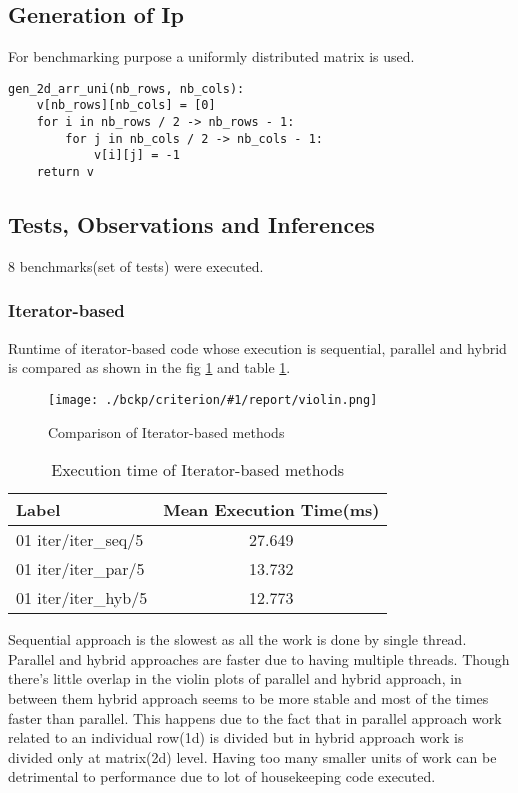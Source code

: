 \documentclass{article}
\newcommand{\loadGraph}[3]{{%
\begin{figure}[!ht]
    \texttt{[image: ./bckp/criterion/\#1/report/violin.png]}
    \caption{#3}
    \label{#2}
\end{figure}}
}%
\begin{document}
\subsection{Generation of Ip}
For benchmarking purpose a uniformly distributed matrix is used.
\begin{lstlisting}[caption = Uniform matrix generation]
gen_2d_arr_uni(nb_rows, nb_cols):
    v[nb_rows][nb_cols] = [0]
    for i in nb_rows / 2 -> nb_rows - 1:
        for j in nb_cols / 2 -> nb_cols - 1:
            v[i][j] = -1
    return v
\end{lstlisting}

\subsection{Tests, Observations and Inferences}
8 benchmarks(set of tests) were executed.


\subsubsection{Iterator-based}
Runtime of iterator-based code whose execution is sequential, parallel and hybrid is compared as shown in the fig \ref{01_iter} and table \ref{iter}.

\loadGraph{01 iter}{01_iter}{Comparison of Iterator-based methods}
\begin{table}[!ht]
\centering
\begin{tabular}{lc}
\toprule
Label               & Mean Execution Time(ms) \\ \midrule
01 iter/iter\_seq/5 & 27.649                  \\
01 iter/iter\_par/5 & 13.732                  \\
01 iter/iter\_hyb/5 & 12.773                  \\ \bottomrule
\end{tabular}
\caption{Execution time of Iterator-based methods}
\label{iter}
\end{table}

Sequential approach is the slowest as all the work is done by single thread.
Parallel and hybrid approaches are faster due to having multiple threads.
Though there's little overlap in the violin plots of parallel and hybrid approach, in between them hybrid approach seems to be more stable and most of the times faster than parallel.
This happens due to the fact that in parallel approach work related to an individual row(1d) is divided but in hybrid approach work is divided only at matrix(2d) level.
Having too many smaller units of work can be detrimental to performance due to lot of housekeeping code executed.
\end{document}

